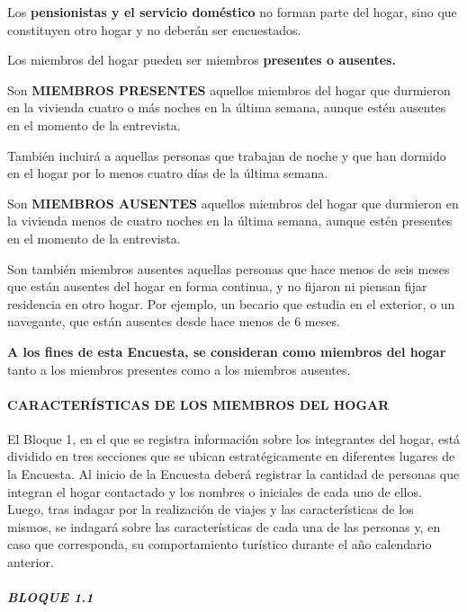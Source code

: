 \documentclass[
  openany]{book}
\begin{document}
Los \textbf{pensionistas y el servicio doméstico} no forman parte del hogar, sino que constituyen otro hogar y no deberán ser encuestados.

Los miembros del hogar pueden ser miembros \textbf{presentes o ausentes.}

Son \textbf{MIEMBROS PRESENTES} aquellos miembros del hogar que durmieron en la vivienda cuatro o más noches en la última semana, aunque estén ausentes en el momento de la entrevista.

También incluirá a aquellas personas que trabajan de noche y que han dormido en el hogar por lo menos cuatro días de la última semana.

Son \textbf{MIEMBROS AUSENTES} aquellos miembros del hogar que durmieron en la vivienda menos de cuatro noches en la última semana, aunque estén presentes en el momento de la entrevista.

Son también miembros ausentes aquellas personas que hace menos de seis meses que están ausentes del hogar en forma continua, y no fijaron ni piensan fijar residencia en otro hogar. Por ejemplo, un becario que estudia en el exterior, o un navegante, que están ausentes desde hace menos de 6 meses.

\textbf{A los fines de esta Encuesta, se consideran como miembros del hogar} tanto a los miembros presentes como a los miembros ausentes.

\hypertarget{caracteruxedsticas-de-los-miembros-del-hogar}{%
\paragraph{\texorpdfstring{\textbf{CARACTERÍSTICAS DE LOS MIEMBROS DEL HOGAR}}{CARACTERÍSTICAS DE LOS MIEMBROS DEL HOGAR}}\label{caracteruxedsticas-de-los-miembros-del-hogar}}

El Bloque 1, en el que se registra información sobre los integrantes del hogar, está dividido en tres secciones que se ubican estratégicamente en diferentes lugares de la Encuesta. Al inicio de la Encuesta deberá registrar la cantidad de personas que integran el hogar contactado y los nombres o iniciales de cada uno de ellos. Luego, tras indagar por la realización de viajes y las características de los mismos, se indagará sobre las características de cada una de las personas y, en caso que corresponda, su comportamiento turístico durante el año calendario anterior.

\hypertarget{bloque-1.1}{%
\subparagraph{\texorpdfstring{\textbf{BLOQUE 1.1}}{BLOQUE 1.1}}\label{bloque-1.1}}
\end{document}
